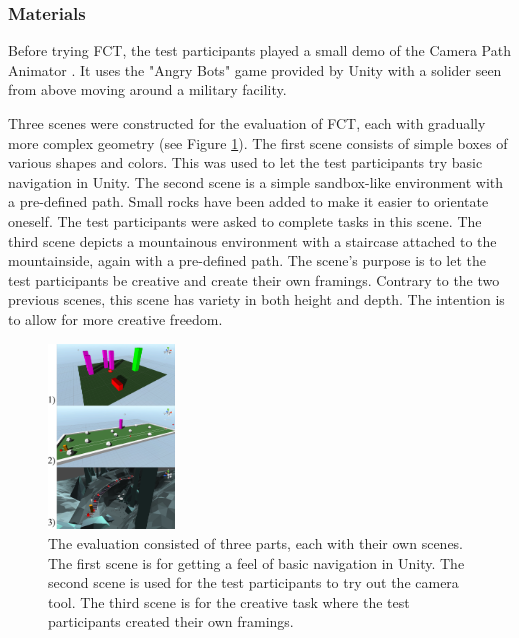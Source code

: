 \subsubsection{Materials}
Before trying FCT, the test participants played a small demo of the Camera Path Animator \cite{unity_camTool}. It uses the "Angry Bots" game provided by Unity \cite{angryBots} with a solider seen from above moving around a military facility.

Three scenes were constructed for the evaluation of FCT, each with gradually more complex geometry (see Figure \ref{fig:sceneAll}). 
The first scene consists of simple boxes of various shapes and colors. This was used to let the test participants try basic navigation in Unity.
The second scene is a simple sandbox-like environment with a pre-defined path. Small rocks have been added to make it easier to orientate oneself. The test participants were asked to complete tasks in this scene.
The third scene depicts a mountainous environment with a staircase attached to the mountainside, again with a pre-defined path. The scene's purpose is to let the test participants be creative and create their own framings. Contrary to the two previous scenes, this scene has variety in both height and depth. The intention is to allow for more creative freedom.


\begin{figure}[htbp]
\centering
\includegraphics[width=0.3\textwidth]{Pics/sceneAll}
\caption{The evaluation consisted of three parts, each with their own scenes. The first scene is for getting a feel of basic navigation in Unity. The second scene is used for the test participants to try out the camera tool. The third scene is for the creative task where the test participants created their own framings.}
\label{fig:sceneAll}
\end{figure}